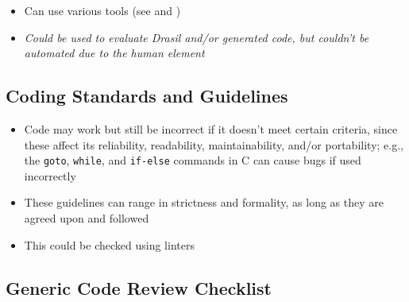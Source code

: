 \begin{itemize}
      \item Can use various tools (see  and
            )

      \item \emph{Could be used to evaluate Drasil and/or generated code, but
                  couldn't be automated due to the human element}

\end{itemize}

\subsection[Coding Standards and Guidelines]{Coding Standards and Guidelines
      \citep[pp.~96-99]{Patton2006}}
\label{code-stds-and-guidelines}

\begin{itemize}
      \item Code may work but still be incorrect if it doesn't meet certain
            criteria, since these affect its reliability, readability,
            maintainability, and/or portability; e.g., the \texttt{goto},
            \texttt{while}, and \texttt{if-else} commands in C can cause bugs
            if used incorrectly \citep[p.~96]{Patton2006}
      \item These guidelines can range in strictness and formality, as long as
            they are agreed upon and followed \citep[p.~96]{Patton2006}
      \item This could be checked using linters
\end{itemize}

\subsection[Generic Code Review Checklist]{Generic Code Review Checklist
      \citep[pp.~99-103]{Patton2006}}
\label{gen-code-review-checklist}

